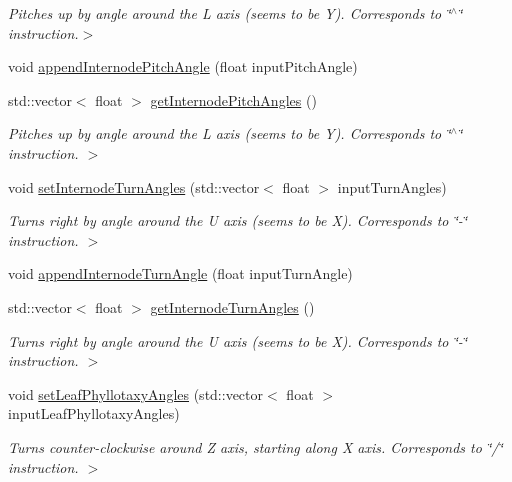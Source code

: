 \begin{DoxyCompactItemize}
\begin{DoxyCompactList}\small\item\em Pitches up by angle around the L axis (seems to be Y). Corresponds to \char`\"{}$^\wedge$\char`\"{} instruction.$>$ \end{DoxyCompactList}\item 
void \hyperlink{classLSystemParameters_af605476ba5e0315e53617953eda145ec}{append\-Internode\-Pitch\-Angle} (float input\-Pitch\-Angle)
\item 
std\-::vector$<$ float $>$ \hyperlink{classLSystemParameters_a25f10717a3d2ffb4caa6949e67b05170}{get\-Internode\-Pitch\-Angles} ()
\begin{DoxyCompactList}\small\item\em Pitches up by angle around the L axis (seems to be Y). Corresponds to \char`\"{}$^\wedge$\char`\"{} instruction. $>$ \end{DoxyCompactList}\item 
void \hyperlink{classLSystemParameters_a11964e14c43fb1dbd443006173ac3993}{set\-Internode\-Turn\-Angles} (std\-::vector$<$ float $>$ input\-Turn\-Angles)
\begin{DoxyCompactList}\small\item\em Turns right by angle around the U axis (seems to be X). Corresponds to \char`\"{}-\/\char`\"{} instruction. $>$ \end{DoxyCompactList}\item 
void \hyperlink{classLSystemParameters_a42c09989d87627bfd5217d5799de6261}{append\-Internode\-Turn\-Angle} (float input\-Turn\-Angle)
\item 
std\-::vector$<$ float $>$ \hyperlink{classLSystemParameters_ae75f4c86bceacdd960c3a41a2de94265}{get\-Internode\-Turn\-Angles} ()
\begin{DoxyCompactList}\small\item\em Turns right by angle around the U axis (seems to be X). Corresponds to \char`\"{}-\/\char`\"{} instruction. $>$ \end{DoxyCompactList}\item 
void \hyperlink{classLSystemParameters_aac5a310edc93f3f431d0bbcef0f64bb5}{set\-Leaf\-Phyllotaxy\-Angles} (std\-::vector$<$ float $>$ input\-Leaf\-Phyllotaxy\-Angles)
\begin{DoxyCompactList}\small\item\em Turns counter-\/clockwise around Z axis, starting along X axis. Corresponds to \char`\"{}/\char`\"{} instruction. $>$ \end{DoxyCompactList}\item 

\end{DoxyCompactItemize}
